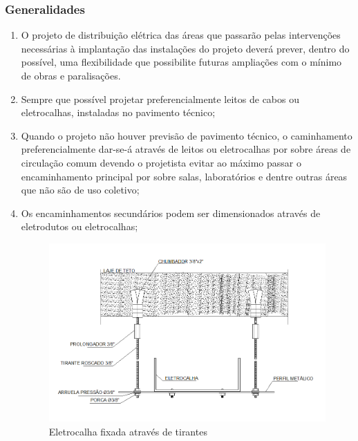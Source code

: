 \subsubsection{Generalidades}

\begin{enumerate}
	\item O projeto de distribuição elétrica das áreas que passarão pelas intervenções necessárias à implantação das instalações do projeto deverá prever, dentro do possível, uma flexibilidade que possibilite futuras ampliações com o mínimo de obras e paralisações. 
	
	\item Sempre que possível projetar preferencialmente leitos de cabos ou eletrocalhas, instaladas no pavimento técnico;
	
	\item Quando o projeto não houver previsão de pavimento técnico, o caminhamento preferencialmente dar-se-á através de leitos ou eletrocalhas por sobre áreas de circulação comum devendo o projetista evitar ao máximo passar o encaminhamento principal por sobre salas, laboratórios e dentre outras áreas que não são de uso coletivo;
	
	\item Os encaminhamentos secundários podem ser dimensionados através de eletrodutos ou eletrocalhas; 
	
	\begin{figure}[H]
		\centering
		\includegraphics[scale=.30]{Figures/5. Hardware/eletrocalha-fixacao1.png}
		\caption{Eletrocalha fixada através de tirantes}
		\label{fig: eletrocalha fixacao1}
	\end{figure}
	
\end{enumerate}